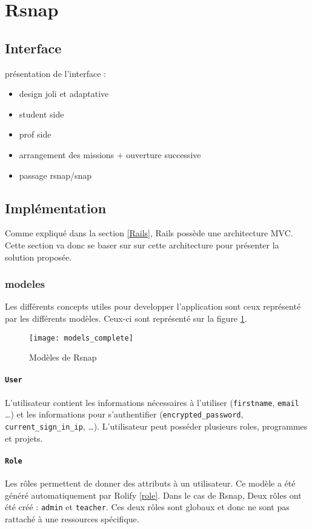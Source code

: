 \section{Rsnap}
\graphicspath{{content/7-solution/3-rsnap/images/}}

\subsection{Interface}
présentation de l'interface :
\begin{itemize}
  \item design joli et adaptative
  \item student side
  \item prof side
  \item arrangement des missions + ouverture successive
  \item passage rsnap/snap
\end{itemize}

\subsection{Implémentation}
Comme expliqué dans la section \ref{Rails}, Rails possède une architecture MVC. Cette section va donc se baser sur sur cette architecture pour présenter la solution proposée.

\subsubsection{modeles}
Les différents concepts utiles pour developper l'application sont ceux représenté par les différents modèles. Ceux-ci sont représenté sur la figure \ref{fig:models}.
\begin{figure}
  \begin{center}
    \texttt{[image: models\_complete]}
    \caption{Modèles de Rsnap}
    \label{fig:models}
  \end{center}
\end{figure}
\paragraph{\texttt{User}} L'utilisateur contient les informations nécessaires à l'utiliser (\texttt{firstname}, \texttt{email} \ldots) et les informations pour s'authentifier (\texttt{encrypted\_password}, \texttt{current\_sign\_in\_ip}, \ldots). L'utilisateur peut posséder plusieurs roles, programmes et projets.
\paragraph{\texttt{Role}} Les rôles permettent de donner des attributs à un utilisateur. Ce modèle a été généré automatiquement par Rolify \ref{role}. Dans le cas de Rsnap, Deux rôles ont été créé : \texttt{admin} et \texttt{teacher}. Ces deux rôles sont globaux et donc ne sont pas rattaché à une ressources spécifique.%

